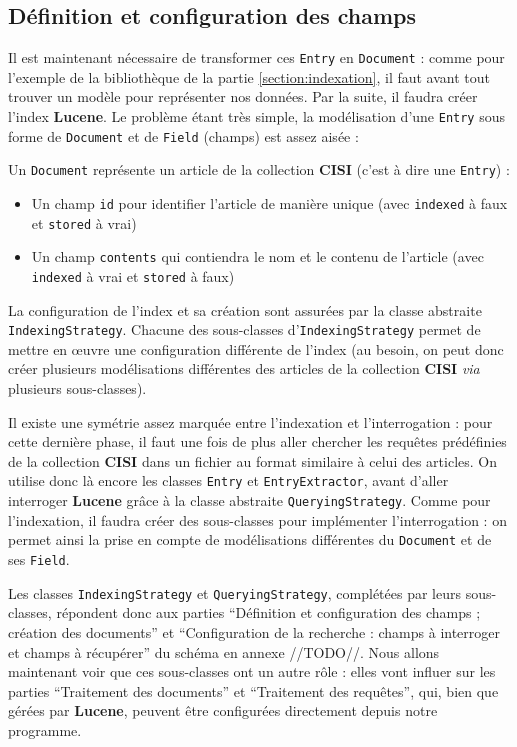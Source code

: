 \subsection{Définition et configuration des champs}

Il est maintenant nécessaire de transformer ces \texttt{Entry} en \texttt{Document} : comme pour l’exemple de la bibliothèque de la partie \ref{section:indexation}, il faut avant tout trouver un modèle pour représenter nos données. Par la suite, il faudra créer l’index \textbf{Lucene}.
Le problème étant très simple, la modélisation d’une \texttt{Entry} sous forme de \texttt{Document} et de \texttt{Field} (champs) est assez aisée :

Un \texttt{Document} représente un article de la collection \textbf{CISI} (c’est à dire une \texttt{Entry}) :
\begin{itemize}
\item Un champ \texttt{id} pour identifier l’article de manière unique (avec \texttt{indexed} à faux et \texttt{stored} à vrai)
\item Un champ \texttt{contents} qui contiendra le nom et le contenu de l’article (avec \texttt{indexed} à vrai et \texttt{stored} à faux)\\
\end{itemize}

La configuration de l’index et sa création sont assurées par la classe abstraite \texttt{IndexingStrategy}. Chacune des sous-classes d’\texttt{IndexingStrategy} permet de mettre en œuvre une configuration différente de l’index (au besoin, on peut donc créer plusieurs modélisations différentes des articles de la collection \textbf{CISI} \textit{via} plusieurs sous-classes).

Il existe une symétrie assez marquée entre l’indexation et l’interrogation : pour cette dernière phase, il faut une fois de plus aller chercher les requêtes prédéfinies de la collection \textbf{CISI} dans un fichier au format similaire à celui des articles. On utilise donc là encore les classes \texttt{Entry} et \texttt{EntryExtractor}, avant d’aller interroger \textbf{Lucene} grâce à la classe abstraite \texttt{QueryingStrategy}. Comme pour l’indexation, il faudra créer des sous-classes pour implémenter l’interrogation : on permet ainsi la prise en compte de modélisations différentes du \texttt{Document} et de ses \texttt{Field}.

Les classes \texttt{IndexingStrategy} et \texttt{QueryingStrategy}, complétées par leurs sous-classes, répondent donc aux parties “Définition et configuration des champs ; création des documents” et “Configuration de la recherche : champs à interroger et champs à récupérer” du schéma en annexe //TODO//. Nous allons maintenant voir que ces sous-classes ont un autre rôle : elles vont influer sur les parties “Traitement des documents” et “Traitement des requêtes”, qui, bien que gérées par \textbf{Lucene}, peuvent être configurées directement depuis notre programme.

